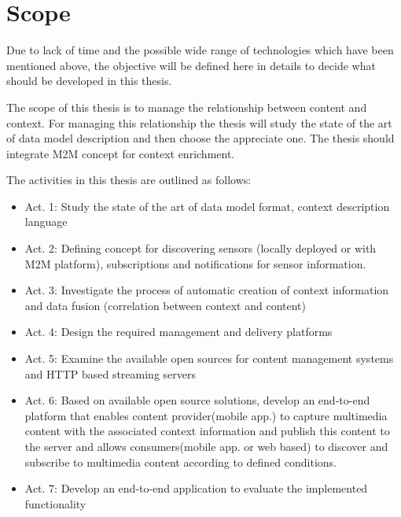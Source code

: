 \section{Scope\label{sec:scope}}

Due to lack of time and the possible wide range of technologies which have been mentioned above, the objective will be defined here in details to decide what should be developed in this thesis.

The scope of this thesis is to manage the relationship between content and context. For managing this relationship the thesis will study the state of the art of data model description and then choose the appreciate one. The thesis should integrate \ac{M2M} concept for context enrichment.


The activities in this thesis are outlined as follows:
	\begin{itemize}
		\item Act. 1: Study the state of the art of data model format, context description language
				\vspace{-0.1in} 
		\item Act. 2: Defining concept for discovering sensors (locally deployed or with \ac{M2M} platform), subscriptions and notifications for sensor information.
				\vspace{-0.1in} 
		\item Act. 3: Investigate the process of automatic creation of context information and data fusion (correlation between context and content)
				\vspace{-0.1in} 		
		\item Act. 4: Design the required management and delivery platforms 
    			\vspace{-0.1in} 
		\item Act. 5: Examine the available open sources for content management systems and \ac{HTTP} based streaming servers
 				\vspace{-0.1in} 
		\item Act. 6: Based on available open source solutions, develop an end-to-end platform that enables content provider(mobile app.) to capture multimedia content with the associated context information and publish this content to the server and allows consumers(mobile app. or web based) to discover and subscribe to multimedia content according to defined conditions. 
    			\vspace{-0.1in} 
    	\item Act. 7: Develop an end-to-end application to evaluate the implemented functionality
    \end{itemize}

